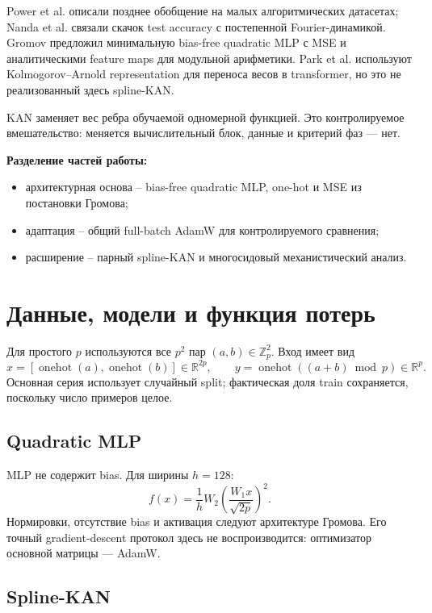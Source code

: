 \documentclass[11pt,a4paper]{article}
\begin{document}
Power et al. описали позднее обобщение на малых алгоритмических датасетах;
Nanda et al. связали скачок test accuracy с постепенной Fourier-динамикой.
Gromov предложил минимальную bias-free quadratic MLP с MSE и аналитическими
feature maps для модульной арифметики. Park et al. используют
Kolmogorov--Arnold representation для переноса весов в transformer, но это не
реализованный здесь spline-KAN.

KAN заменяет вес ребра обучаемой одномерной функцией. Это контролируемое
вмешательство: меняется вычислительный блок, данные и критерий фаз --- нет.

\textbf{Разделение частей работы:}

\begin{itemize}
  \item архитектурная основа -- bias-free quadratic MLP, one-hot и MSE из
        постановки Громова;
  \item адаптация -- общий full-batch AdamW для контролируемого сравнения;
  \item расширение -- парный spline-KAN и многосидовый механистический анализ.
\end{itemize}

\clearpage
\section{Данные, модели и функция потерь}

Для простого $p$ используются все $p^2$ пар $(a,b)\in\mathbb Z_p^2$. Вход
имеет вид
\[
x=[\operatorname{onehot}(a),\operatorname{onehot}(b)]\in\mathbb R^{2p},
\qquad
y=\operatorname{onehot}((a+b)\bmod p)\in\mathbb R^p.
\]
Основная серия использует случайный split; фактическая доля train сохраняется,
поскольку число примеров целое.

\subsection{Quadratic MLP}

MLP не содержит bias. Для ширины $h=128$:
\[
f(x)=\frac{1}{h}W_2\left(\frac{W_1x}{\sqrt{2p}}\right)^{\!2}.
\]
Нормировки, отсутствие bias и активация следуют архитектуре Громова. Его
точный gradient-descent протокол здесь не воспроизводится: оптимизатор основной
матрицы --- AdamW.

\subsection{Spline-KAN}
\end{document}
